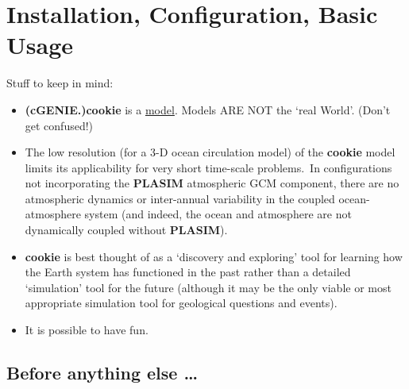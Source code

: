 
\cleardoublepage


\setcounter{chapter}{-1}
\chapter{Installation, Configuration, Basic Usage}\label{ch:0}

\hfill \break

\vspace{16mm}

\noindent Stuff to keep in mind:

\vspace{2mm}

\begin{itemize}
\item \textbf{(cGENIE.)cookie} is a \uline{model}. Models ARE NOT the ‘real World’. (Don’t get confused!)
\item The  low resolution (for a 3-D ocean circulation model) of the \textbf{cookie} model limits its applicability for very short time-scale problems.\ In configurations not incorporating the \textbf{PLASIM} atmospheric GCM component, there are no atmospheric dynamics or inter-annual variability in the coupled ocean-atmosphere system (and indeed, the ocean and atmosphere are not dynamically coupled without \textbf{PLASIM}).
\item \textbf{cookie} is best thought of as a ‘discovery and exploring’ tool for learning how the Earth system has functioned in the past rather than a detailed ‘simulation’ tool for the future (although it may be the only viable or most appropriate simulation tool for geological questions and events).
\item It is possible to have fun.
\end{itemize}

\newpage

\section{Before anything else …}

